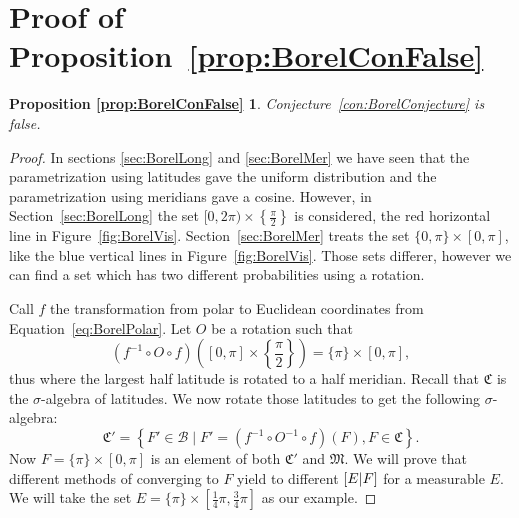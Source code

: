\documentclass[a4paper]{report}
\theoremstyle{plain}
\newtheorem*{propositionBorelConFalse}{Proposition \ref{prop:BorelConFalse}}
\theoremstyle{definition}
\theoremstyle{remark}
\numberwithin{equation}{chapter}
\let\P\relax
\DeclareMathOperator{\P}{\mathbb{P}}
\DeclareMathOperator{\1}{\mathbbm{1}}
\newcommand{\B}{\mathcal{B}}
\begin{document}
\section{Proof of Proposition~\ref{prop:BorelConFalse}}\label{app:ProofBorelConFalse}
\begin{propositionBorelConFalse}
Conjecture~\ref{con:BorelConjecture} is false.
\end{propositionBorelConFalse}
\begin{proof}

In sections \ref{sec:BorelLong} and \ref{sec:BorelMer} we have seen that the parametrization using latitudes gave the uniform distribution and the parametrization using meridians gave a cosine. However, in Section~\ref{sec:BorelLong} the set $[0,2\pi)\times\left\{\frac{\pi}{2}\right\}$ is considered, the red horizontal line in Figure~\ref{fig:BorelVis}. Section~\ref{sec:BorelMer} treats the set $\{0,\pi\}\times[0,\pi]$, like the blue vertical lines in Figure~\ref{fig:BorelVis}. Those sets differer, however we can find a set which has two different probabilities using a rotation.

Call $f$ the transformation from polar to Euclidean coordinates from Equation~\ref{eq:BorelPolar}. Let $O$ be a rotation such that
\begin{equation}
(f^{-1}\circ O\circ f)\left([0,\pi]\times\left\{\frac{\pi}{2}\right\}\right)=\{\pi\}\times[0,\pi],
\end{equation}
thus where the largest half latitude is rotated to a half meridian. Recall that $\mathfrak{C}$ is the $\sigma$-algebra of latitudes. We now rotate those latitudes to get the following $\sigma$-algebra:
\begin{equation}
\mathfrak{C}'=\left\{F'\in\B\mid F'=\left(f^{-1}\circ O^{-1}\circ f\right)(F),F\in\mathfrak{C}\right\}.
\end{equation}
Now $F=\{\pi\}\times[0,\pi]$ is an element of both $\mathfrak{C}'$ and $\mathfrak{M}$. We will prove that different methods of converging to $F$ yield to different $\P[E|F]$ for a measurable $E$. We will take the set $E=\{\pi\}\times\left[\frac{1}{4}\pi,\frac{3}{4}\pi\right]$ as our example.


\end{proof}
\end{document}
